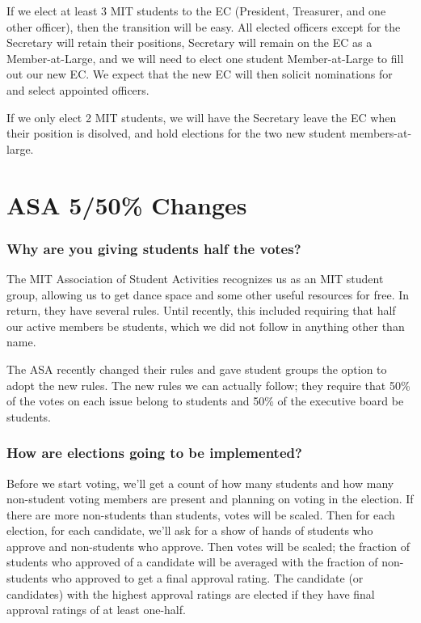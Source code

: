 \documentclass{article}
\begin{document}
If we elect at least 3 MIT students to the EC (President, Treasurer, and one other officer), then the transition will be easy. All elected officers except for the Secretary will retain their positions, Secretary will remain on the EC as a Member-at-Large, and we will need to elect one student Member-at-Large to fill out our new EC. We expect that the new EC will then solicit nominations for and select appointed officers.

If we only elect 2 MIT students, we will have the Secretary leave the EC when their position is disolved, and hold elections for the two new student members-at-large.


\section{ASA 5/50\% Changes}

\subsubsection*{Why are you giving students half the votes?}
The MIT Association of Student Activities recognizes us as an MIT student group, allowing us to get dance space and some other useful resources for free. In return, they have several rules. Until recently, this included requiring that half our active members be students, which we did not follow in anything other than name.

The ASA recently changed their rules and gave student groups the option to adopt the new rules. The new rules we can actually follow; they require that 50\% of the votes on each issue belong to students and 50\% of the executive board be students.

\subsubsection*{How are elections going to be implemented?}
Before we start voting, we'll get a count of how many students and how many non-student voting members are present and planning on voting in the election. If there are more non-students than students, votes will be scaled.  Then for each election, for each candidate, we'll ask for a show of hands of students who approve and non-students who approve. Then votes will be scaled; the fraction of students who approved of a candidate will be averaged with the fraction of non-students who approved to get a final approval rating. The candidate (or candidates) with the highest approval ratings are elected if they have final approval ratings of at least one-half.
\end{document}
